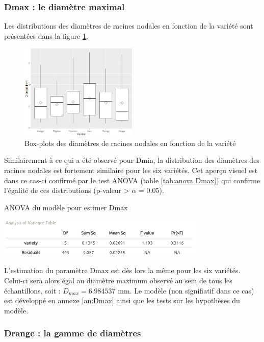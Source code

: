 \subsubsection{Dmax : le diamètre maximal}

Les distributions des diamètres de racines nodales en fonction de la variété sont présentées dans la figure \ref{fig:boxplot Dmax}.

\begin{figure}[ht]
\centering
\includegraphics[width=0.5\textwidth]{Image/boxplot Dmax.png}
\caption{Box-plots des diamètres de racines nodales en fonction de la variété}
\label{fig:boxplot Dmax}
\end{figure}
\newpage

Similairement à ce qui a été observé pour Dmin, la distribution des diamètres des racines nodales est fortement similaire pour les six variétés.
Cet aperçu visuel est dans ce cas-ci confirmé par le test ANOVA (table \ref{tab:anova Dmax}) qui confirme l'égalité de ces distributions (p-valeur > $\alpha$ = 0.05).

\begin{table}[!ht]
    \centering
    \caption{ANOVA du modèle pour estimer Dmax}
    \includegraphics[width=0.75\textwidth]{Image/anova Dmax.png}
    \label{tab:anova Dmax}
\end{table}

L'estimation du paramètre Dmax est dès lors la même pour les six variétés.
Celui-ci sera alors égal au diamètre maximum observé au sein de tous les échantillons, soit : $D_{max} = 6.984537$ mm.
Le modèle (non signifiatif dans ce cas) est développé en annexe \ref{an:Dmax} ainsi que les tests sur les hypothèses du modèle.

\subsubsection{Drange : la gamme de diamètres}

